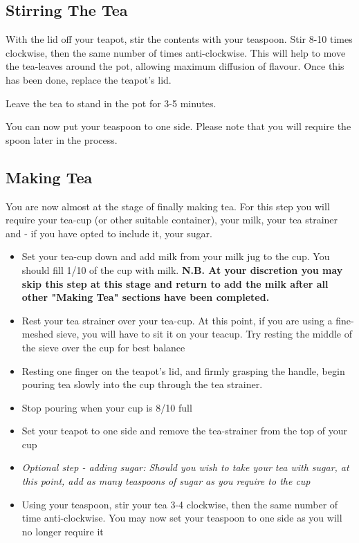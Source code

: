 \documentclass{article}
\begin{document}
\subsection{Stirring The Tea}
With the lid off your teapot, stir the contents with your teaspoon. Stir 8-10 times clockwise, then the same number of times anti-clockwise. This will help to move the tea-leaves around the pot, allowing maximum diffusion of flavour. Once this has been done, replace the teapot's lid.

Leave the tea to stand in the pot for 3-5 minutes.

You can now put your teaspoon to one side. Please note that you will require the spoon later in the process.

\subsection{Making Tea}
You are now almost at the stage of finally making tea. For this step you will require your tea-cup (or other suitable container), your milk, your tea strainer and - if you have opted to include it, your sugar.
\begin{itemize}
\item Set your tea-cup down and add milk from your milk jug to the cup. You should fill 1/10 of the cup with milk. {\bf N.B. At your discretion you may skip this step at this stage and return to add the milk after all other "Making Tea" sections have been completed.}
\item Rest your tea strainer over your tea-cup. At this point, if you are using a fine-meshed sieve, you will have to sit it on your teacup. Try resting the middle of the sieve over the cup for best balance
\item Resting one finger on the teapot's lid, and firmly grasping the handle, begin pouring tea slowly into the cup through the tea strainer.
\item Stop pouring when your cup is 8/10 full
\item Set your teapot to one side and remove the tea-strainer from the top of your cup
\item {\it Optional step - adding sugar: Should you wish to take your tea with sugar, at this point, add as many teaspoons of sugar as you require to the cup}
\item Using your teaspoon, stir your tea 3-4 clockwise, then the same number of time anti-clockwise. You may now set your teaspoon to one side as you will no longer require it
\end{itemize}
\end{document}

